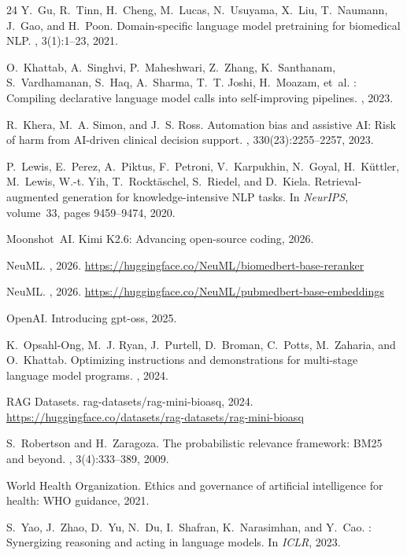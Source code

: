 \documentclass[sigconf,anonymous,review]{acmart}
\begin{document}
\begin{thebibliography}{24}
Y.~Gu, R.~Tinn, H.~Cheng, M.~Lucas, N.~Usuyama, X.~Liu, T.~Naumann, J.~Gao, and H.~Poon.
\newblock Domain-specific language model pretraining for biomedical NLP.
, 3(1):1--23, 2021.

O.~Khattab, A.~Singhvi, P.~Maheshwari, Z.~Zhang, K.~Santhanam, S.~Vardhamanan, S.~Haq, A.~Sharma, T.~T. Joshi, H.~Moazam, et~al.
: Compiling declarative language model calls into self-improving pipelines.
, 2023.

R.~Khera, M.~A. Simon, and J.~S. Ross.
\newblock Automation bias and assistive {AI}: Risk of harm from {AI}-driven clinical decision support.
, 330(23):2255--2257, 2023.

P.~Lewis, E.~Perez, A.~Piktus, F.~Petroni, V.~Karpukhin, N.~Goyal, H.~K\"uttler, M.~Lewis, W.-t. Yih, T.~Rockt\"aschel, S.~Riedel, and D.~Kiela.
\newblock Retrieval-augmented generation for knowledge-intensive {NLP} tasks.
\newblock In {\em NeurIPS}, volume~33, pages 9459--9474, 2020.

Moonshot~AI.
\newblock Kimi {K2.6}: Advancing open-source coding, 2026.

NeuML.
, 2026.
\newblock \url{https://huggingface.co/NeuML/biomedbert-base-reranker}

NeuML.
, 2026.
\newblock \url{https://huggingface.co/NeuML/pubmedbert-base-embeddings}

OpenAI.
\newblock Introducing gpt-oss, 2025.

K.~Opsahl-Ong, M.~J. Ryan, J.~Purtell, D.~Broman, C.~Potts, M.~Zaharia, and O.~Khattab.
\newblock Optimizing instructions and demonstrations for multi-stage language model programs.
, 2024.

RAG Datasets.
\newblock rag-datasets/rag-mini-bioasq, 2024.
\newblock \url{https://huggingface.co/datasets/rag-datasets/rag-mini-bioasq}

S.~Robertson and H.~Zaragoza.
\newblock The probabilistic relevance framework: {BM25} and beyond.
, 3(4):333--389, 2009.

World Health Organization.
\newblock Ethics and governance of artificial intelligence for health: {WHO} guidance, 2021.

S.~Yao, J.~Zhao, D.~Yu, N.~Du, I.~Shafran, K.~Narasimhan, and Y.~Cao.
: Synergizing reasoning and acting in language models.
\newblock In {\em ICLR}, 2023.

\end{thebibliography}
\end{document}
